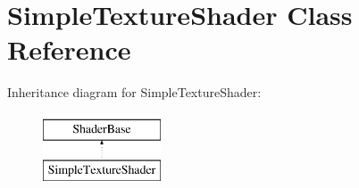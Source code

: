 \hypertarget{classSimpleTextureShader}{\section{\-Simple\-Texture\-Shader \-Class \-Reference}
\label{classSimpleTextureShader}
}
\-Inheritance diagram for \-Simple\-Texture\-Shader\-:\begin{figure}[H]
\begin{center}
\leavevmode
\includegraphics[height=2.000000cm]{classSimpleTextureShader}
\end{center}
\end{figure}
